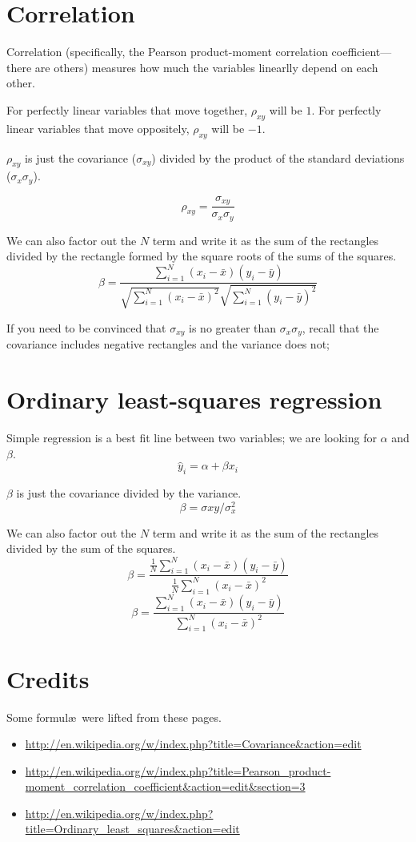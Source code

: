 \documentclass{article}
\begin{document}
\section{Correlation}
Correlation (specifically, the Pearson product-moment correlation coefficient---there are others)
measures how much the variables linearlly depend on each other.

For perfectly linear variables that move together, $\rho_{xy}$ will be $1$.
For perfectly linear variables that move oppositely, $\rho_{xy}$ will be $-1$.

$\rho_{xy}$ is just the covariance ($\sigma_{xy}$) divided by
the product of the standard deviations ($\sigma_x\sigma_y$).

$$ \rho_{xy} = \frac{\sigma_{xy}}{\sigma_x\sigma_y} $$

We can also factor out the $N$ term and write it as the sum of the rectangles divided by
the rectangle formed by the square roots of the sums of the squares.
$$ \beta = \frac
{ \sum_{i=1}^{N}\left( x_{i}-\bar{x} \right) \left( y_{i}-\bar{y} \right) }
{
  \sqrt{\sum_{i=1}^{N}\left( x_{i}-\bar{x} \right)^2}
  \sqrt{\sum_{i=1}^{N}\left( y_{i}-\bar{y} \right)^2}
}
$$

If you need to be convinced that $\sigma_{xy}$ is no greater than $\sigma_x\sigma_y$,
recall that the covariance includes negative rectangles and the variance does not;



\section{Ordinary least-squares regression}
Simple regression is a best fit line between two variables; we are looking for $\alpha$ and $\beta$.
$$ \hat{y}_i = \alpha + \beta x_i$$

$\beta$ is just the covariance divided by the variance.
$$ \beta = \sigma{xy}/\sigma_x^2 $$

We can also factor out the $N$ term and write it as the sum of the rectangles divided by the sum of the squares.
$$ \beta = \frac
{\frac{1}{N}\sum_{i=1}^{N}\left( x_{i}-\bar{x} \right) \left( y_{i}-\bar{y} \right)}
{\frac{1}{N}\sum_{i=1}^{N}\left( x_{i}-\bar{x} \right)^2}
$$
$$ \beta = \frac
{\sum_{i=1}^{N}\left( x_{i}-\bar{x} \right) \left( y_{i}-\bar{y} \right)}
{\sum_{i=1}^{N}\left( x_{i}-\bar{x} \right)^2}
$$

\section{Credits}
Some formul\ae\ were lifted from these pages.
\begin{itemize}
\item \url{http://en.wikipedia.org/w/index.php?title=Covariance&action=edit}
\item \url{http://en.wikipedia.org/w/index.php?title=Pearson_product-moment_correlation_coefficient&action=edit&section=3}
\item \url{http://en.wikipedia.org/w/index.php?title=Ordinary_least_squares&action=edit}
\end{itemize}
\end{document}
